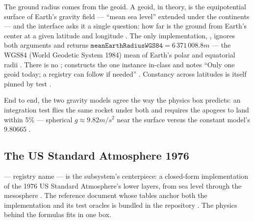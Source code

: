 The ground radius comes from the geoid. A geoid, in theory, is the equipotential surface of
Earth's gravity field --- ``mean sea level'' extended under the continents --- and the
interface asks it a single question: how far is the ground from Earth's center at a given
latitude and longitude . The only implementation,
, ignores both arguments and returns
$\mathtt{meanEarthRadiusWGS84} = 6\,371\,008.8\unit{m}$
  --- the WGS84
(World Geodetic System 1984) mean of Earth's polar and equatorial radii
. There is no ; 
constructs the one instance in-class and notes ``Only one geoid today; a registry can follow
if needed'' . Constancy across latitudes is itself pinned by
test .

End to end, the two gravity models agree the way the physics box predicts: an integration
test flies the same rocket under both and requires the apogees to land within 5\% ---
spherical $g \approx 9.82\unit{m/s^2}$ near the surface versus the constant model's
$9.80665$ .

\subsection{The US Standard Atmosphere 1976}\label{sec:environment-ussa}

 --- registry name  --- is the
subsystem's centerpiece: a closed-form implementation of the 1976 US Standard Atmosphere's
lower layers, from sea level through the mesosphere
. The reference document whose tables anchor both the
implementation and its test oracles is bundled in the repository
. The physics behind the formulas
fits in one box.

